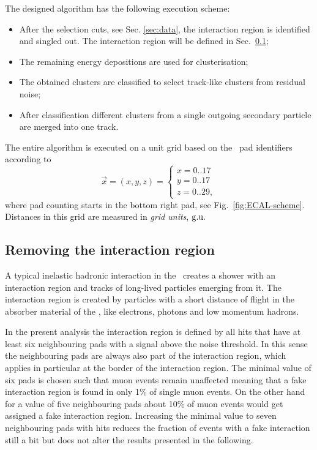 The designed algorithm has the following execution scheme:
\begin{itemize}
	\item After the selection cuts, see Sec. \ref{sec:data}, the interaction region is identified and singled out. The interaction region will be defined in Sec.~\ref{sec:iazone};
	\item The remaining energy depositions are used for clusterisation;
	\item The obtained clusters are classified to select track-like clusters from residual noise; %
	\item After classification different clusters from a single outgoing secondary particle are merged into one track.
\end{itemize}
The entire algorithm is executed on a unit grid based on the \ecal\ pad identifiers according to 
\begin{equation}
\vec{x} = (x,y,z)=\left
\{
\begin{array}{c}
x= 0 .. 17 \\ 
y=0 .. 17 \\
z = 0 .. 29,
\end{array}
\right.
\end{equation}
where pad counting starts in the bottom right pad, see Fig.~\ref{fig:ECAL-scheme}. Distances in this grid are measured in {\em grid units}, ${\rm g.u.}$  




\subsection{Removing the interaction region}
\label{sec:iazone}
A typical inelastic hadronic interaction in the \ecal\ creates a shower with an interaction region and tracks of long-lived particles emerging from it. The interaction region is created by particles with a short distance of flight in the absorber material of the \ecal, like electrons, photons and low momentum hadrons. 

In the present analysis the interaction region is defined by all hits that have at least six neighbouring pads with a signal above the noise threshold. In this sense the neighbouring pads are always also part of the interaction region, which applies in particular at the border of the interaction region. The minimal value of six pads is chosen such that muon events remain unaffected meaning that a fake interaction region is found in only 1\% of single muon events. On the other hand for a value of five neighbouring pads about 10\% of muon events would get assigned a fake interaction region. Increasing the minimal value to seven neighbouring pads with hits reduces the fraction of events with a fake interaction still a bit but does not alter the results presented in the following.

